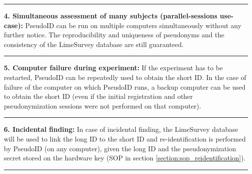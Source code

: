 \par\noindent\rule{\textwidth\color{pniblue}}{0.4pt}
\textbf{4. Simultaneous assessment of many subjects (parallel-sessions use-case):}
PseudoID can be run on multiple computers simultaneously without any further notice. The reproducibility and uniqueness of pseudonyms and the consistency of the LimeSurvey database are still guaranteed.

\par\noindent\rule{\textwidth\color{pniblue}}{0.4pt}
\textbf{5. Computer failure during experiment:}
If the experiment has to be restarted, PseudoID can be repeatedly used to obtain the short ID. In the case of failure of the computer on which PseudoID runs, a backup computer can be used to obtain the short ID (even if the initial registration and other pseudonymization sessions were not performed on that computer).

\par\noindent\rule{\textwidth\color{pniblue}}{0.4pt}
\textbf{6. Incidental finding:} In case of incidental finding, the LimeSurvey database will be used to link the long ID to the short ID and re-identification is performed by PseudoID (on any computer), given the long ID and the pseudonymization secret stored on the hardware key (SOP in section \ref{section:sop_reidentification}). 

\par\noindent\rule{\textwidth\color{pniblue}}{0.4pt}
